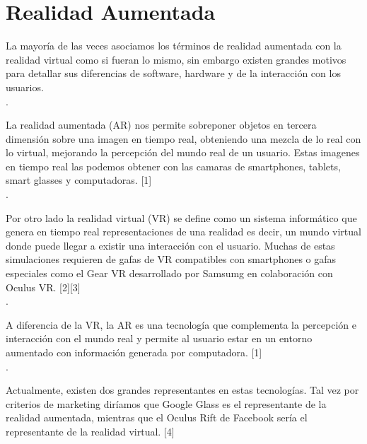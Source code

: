 \section{Realidad Aumentada}

La mayoría de las veces asociamos los términos de realidad aumentada con la realidad virtual como si fueran lo mismo, sin embargo existen grandes motivos para detallar sus diferencias de software, hardware y de la interacción con los usuarios. \\.\par 

La realidad aumentada (AR) nos permite sobreponer objetos en tercera dimensión sobre una imagen en tiempo real, obteniendo una mezcla de lo real con lo virtual, mejorando la percepción del mundo real de un usuario. Estas imagenes en tiempo real las podemos obtener con las camaras de smartphones, tablets, smart glasses y computadoras. [1] \\. \par

Por otro lado la realidad virtual (VR) se define como un sistema informático que genera en tiempo real representaciones de una realidad es decir, un mundo virtual donde puede llegar a existir una interacción con el usuario. Muchas de estas simulaciones requieren de gafas de VR compatibles con smartphones o gafas especiales como el Gear VR desarrollado por Samsumg en colaboración con Oculus VR. [2][3] \\. \par

A diferencia de la VR, la AR es una tecnología que complementa  la percepción  e interacción  con el mundo real y permite al usuario estar en un entorno aumentado con información generada por computadora. [1] \\. \par

Actualmente, existen dos grandes representantes en estas tecnologías. Tal vez por criterios de marketing diríamos que Google Glass es el representante de la realidad aumentada, mientras que el Oculus Rift de Facebook sería el representante de la realidad virtual. [4]
